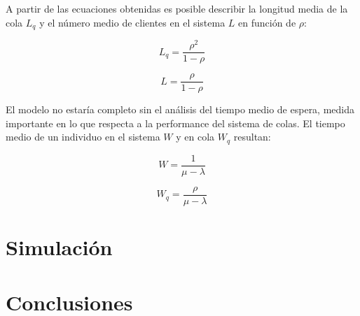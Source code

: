 \documentclass{sig-alternate}
\begin{document}
A partir de las ecuaciones obtenidas es posible describir la longitud media
de la cola $L_{q}$ y el n\'{u}mero medio de clientes en el sistema $L$ en 
funci\'{o}n de $\rho$:

\begin{equation}
\label{longitud_media_en_la_cola}
L_{q} = \frac{\rho^{2}}{1-\rho}
\end{equation}

\begin{equation}
\label{numero_medio_clientes_en_el_sistema}
L = \frac{\rho}{1-\rho}
\end{equation}


El modelo no estar\'{i}a completo sin el an\'{a}lisis del tiempo medio de 
espera, medida importante en lo que respecta a la performance del sistema
de colas. El tiempo medio de un individuo en el sistema $W$ y en cola $W_{q}$
resultan:

\begin{equation}
\label{tiempo_medio_en_el_sistema}
W = \frac{1}{\mu - \lambda}
\end{equation}

\begin{equation}
\label{tiempo_medio_en_la_cola}
W_{q} = \frac{\rho}{\mu - \lambda}
\end{equation}


\section{Simulaci\'{o}n}\label{simulacion}

\section{Conclusiones}\label{conclusiones}
\end{document}
